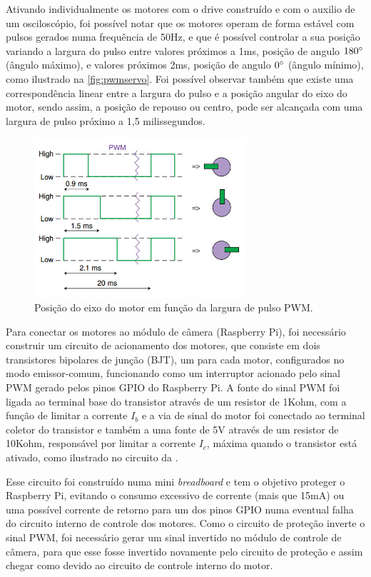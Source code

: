 Ativando individualmente os motores com o drive construído e com o auxilio de um osciloscópio, foi possível notar que os motores operam de forma estável com pulsos gerados numa frequência de 50Hz, e que é possível controlar a sua posição variando a largura do pulso entre valores próximos a 1ms, posição de angulo $180\degree$ (ângulo máximo), e valores próximos 2ms, posição de angulo $0\degree$ (ângulo mínimo), como ilustrado na \autoref{fig:pwmservo}. Foi possível observar também que existe uma correspondência linear entre a largura do pulso e a posição angular do eixo do motor, sendo assim, a posição de repouso ou centro, pode ser alcançada com uma largura de pulso próximo a 1,5 milissegundos. 

\begin{figure}[H]
	\centering
	\includegraphics[width=0.7\textwidth]{figuras/pwm_servo.jpg}
	\caption{Posição do eixo do motor em função da largura de pulso PWM.}
	\label{fig:pwmservo}
\end{figure}

Para conectar os motores ao módulo de câmera (Raspberry Pi), foi necessário construir um circuito de acionamento dos motores, que consiste em dois transistores bipolares de junção (BJT), um para cada motor, configurados no modo emissor-comum, funcionando como um interruptor acionado pelo sinal PWM gerado pelos pinos GPIO do Raspberry Pi. A fonte do sinal PWM foi ligada ao terminal base do transistor através de um resistor de 1Kohm, com a função de limitar a corrente $I_b$ e a via de sinal do motor foi conectado ao terminal coletor do transistor e também a uma fonte de 5V através de um resistor de 10Kohm, responsável por limitar a corrente $I_c$, máxima quando o transistor está ativado, como ilustrado no circuito da .\par
Esse circuito foi construído numa mini \textit{breadboard} e tem o objetivo proteger o Raspberry Pi, evitando o consumo excessivo de corrente (mais que 15mA) ou uma possível corrente de retorno para um dos pinos GPIO numa eventual falha do circuito interno de controle dos motores. Como o circuito de proteção inverte o sinal PWM, foi necessário gerar um sinal invertido no módulo de controle de câmera, para que esse fosse invertido novamente pelo circuito de proteção e assim chegar como devido ao circuito de controle interno do motor.

